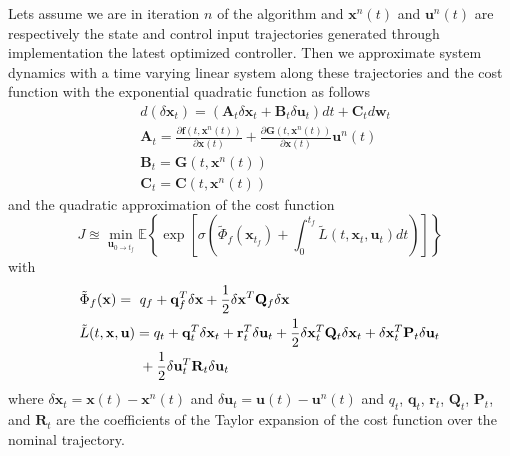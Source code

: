 \documentclass[letterpaper, 10 pt, conference]{ieeeconf}
\newcommand{\vf}{\mathbf f}
\newcommand{\vq}{\mathbf q}
\newcommand{\vr}{\mathbf r}
\newcommand{\vu}{\mathbf u}
\newcommand{\vw}{\mathbf w}
\newcommand{\vx}{\mathbf x}
\newcommand{\vA}{\mathbf A}
\newcommand{\vB}{\mathbf B}
\newcommand{\vC}{\mathbf C}
\newcommand{\vG}{\mathbf G}
\newcommand{\vP}{\mathbf P}
\newcommand{\vQ}{\mathbf Q}
\newcommand{\vR}{\mathbf R}
\begin{document}
Lets assume we are in iteration $n$ of the algorithm and $\vx^n(t)$ and
$\vu^n(t)$ are respectively the state and control input trajectories generated
through implementation the latest optimized controller. Then we approximate
system dynamics with a time varying linear system along these trajectories and
the cost function with the exponential quadratic function as follows
\begin{align} \label{eq:dynamics_linear_approximation}
& d(\delta\vx_t) = \left( \vA_t\delta\vx_t + \vB_t\delta\vu_t \right)dt + \vC_t d\vw_t \\
& \vA_t = \frac{\partial \vf(t,\vx^n(t))}{\partial \vx(t)}  + \frac{\partial \vG(t,\vx^n(t))}{\partial \vx(t)}\vu^n(t) \label{eq:A} \\
& \vB_t = \vG(t,\vx^n(t)) \label{eq:B}  \\
& \vC_t = \vC(t,\vx^n(t)) \label{eq:C} 
\end{align}
and the quadratic approximation of the cost function
\begin{equation} \label{eq:cost_quadratic_approximation}
J \approxeq \min\limits_{ \vu_{0 \to t_f}} \mathbb{E}\left\{ \exp\left[ \sigma \left(\tilde{\Phi}_f(\vx_{t_f})+ \int_0^{t_f} { \tilde{L}(t,\vx_t,\vu_t)dt}\right) \right] \right\}
\end{equation}
with
\begin{align}
&\tilde{\Phi}_f(\vx) = \ q_f + \vq_f^T \delta\vx + \frac{1}{2} \delta\vx^T \vQ_f \delta\vx \label{eq:cost_quadratic_approximation_detail_1} \\
& \tilde{L}(t,\vx,\vu) = q_{t} + \vq_{t}^T \delta\vx_{t} + \vr_{t}^T \delta\vu_{t} + \frac{1}{2} \delta\vx_{t}^T \vQ_{t} \delta\vx_{t} + \delta\vx_{t}^T \vP_{t} \delta\vu_{t}  \notag \\ 
& \hspace{15mm} + \frac{1}{2} \delta\vu_{t}^T \vR_{t} \delta\vu_{t} \label{eq:cost_quadratic_approximation_detail_2}
\end{align} 
where $\delta \vx_t = \vx(t)-\vx^n(t)$ and $\delta\vu_t = \vu(t)-\vu^n(t)$ and $q_t$, $\vq_t$, $\vr_t$, $\vQ_t$, $\vP_t$, and $\vR_t$ are the coefficients of the Taylor expansion of the cost function over the nominal trajectory.
\end{document}
